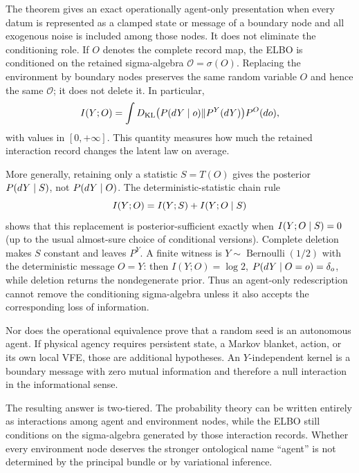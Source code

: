 The theorem gives an exact operationally agent-only presentation when every
datum is represented as a clamped state or message of a boundary node and all
exogenous noise is included among those nodes.  It does not eliminate the
conditioning role.  If $O$ denotes the complete record map, the ELBO is
conditioned on the retained sigma-algebra $\mathscr O=\sigma(O)$.  Replacing
the environment by boundary nodes preserves the same random variable $O$ and
hence the same $\mathscr O$; it does not delete it.  In particular,
\begin{equation}
I(Y;O)=\int
D_{\mathrm{KL}}\bigl(P(dY\mid o)\Vert P^Y(dY)\bigr)P^O(do),
\label{eq:obs-conditioning-information}
\end{equation}
with values in $[0,+\infty]$.  This quantity measures how much the retained
interaction record changes the latent law on average.  

More generally, retaining only a statistic $S=T(O)$ gives the posterior
$P(dY\mid S)$, not $P(dY\mid O)$.  The deterministic-statistic chain rule
\begin{equation}
I(Y;O)=I(Y;S)+I(Y;O\mid S)
\label{eq:obs-conditioning-statistic-chain}
\end{equation}
shows that this replacement is posterior-sufficient exactly when
$I(Y;O\mid S)=0$ (up to the usual almost-sure choice of conditional
versions).  Complete deletion makes $S$ constant and leaves $P^Y$.  A finite
witness is $Y\sim\operatorname{Bernoulli}(1/2)$ with the deterministic message
$O=Y$: then $I(Y;O)=\log2$, $P(dY\mid O=o)=\delta_o$, while deletion returns
the nondegenerate prior.  Thus an agent-only redescription cannot remove the
conditioning sigma-algebra unless it also accepts the corresponding loss of
information.  

Nor does the operational equivalence prove that a random seed is an autonomous
agent.  If physical agency requires persistent state, a Markov blanket,
action, or its own local VFE, those are additional hypotheses.  An
$Y$-independent kernel is a boundary message with zero mutual information and
therefore a null interaction in the informational sense.

The resulting answer is two-tiered.  The probability theory can be written
entirely as interactions among agent and environment nodes, while the ELBO
still conditions on the sigma-algebra generated by those interaction records.
Whether every environment node deserves the stronger ontological name
``agent'' is not determined by the principal bundle or by variational
inference.  
